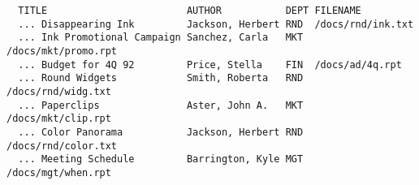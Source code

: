 \begin{screen}
\begin{verbatim}
  TITLE                        AUTHOR           DEPT FILENAME
  ... Disappearing Ink         Jackson, Herbert RND  /docs/rnd/ink.txt
  ... Ink Promotional Campaign Sanchez, Carla   MKT  /docs/mkt/promo.rpt
  ... Budget for 4Q 92         Price, Stella    FIN  /docs/ad/4q.rpt
  ... Round Widgets            Smith, Roberta   RND  /docs/rnd/widg.txt
  ... Paperclips               Aster, John A.   MKT  /docs/mkt/clip.rpt
  ... Color Panorama           Jackson, Herbert RND  /docs/rnd/color.txt
  ... Meeting Schedule         Barrington, Kyle MGT  /docs/mgt/when.rpt
\end{verbatim}
\end{screen}

%
%
%
%
%
%
%
%
%
